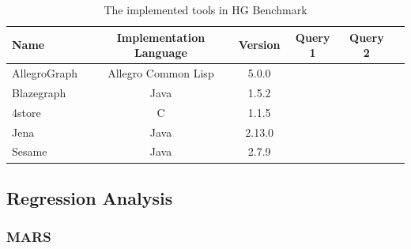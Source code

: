 \begin{table}[ht]
	\footnotesize
	\centering
	
	\begin{tabular}{ l c c c c c}
		\toprule
		Name & Implementation Language& Version & Query 1 & Query 2\\ 
		\midrule 
		AllegroGraph~\cite{allegro} & Allegro Common Lisp & 5.0.0  & \textbullet&  \textbullet \\ \hline
		Blazegraph~\cite{blaze} & Java  & 1.5.2 & \textbullet & \textbullet\\ \hline
		4store~\cite{4store} & C  & 1.1.5 & & \textbullet \\ \hline
		Jena~\cite{jena_api} & Java & 2.13.0 & \textbullet & \textbullet\\ \hline
		Sesame~\cite{sesame} & Java & 2.7.9 & \textbullet & \textbullet\\ \hline
		\bottomrule
	\end{tabular}
	\caption{The implemented tools in HG Benchmark}
	\label{tab:tools}
\end{table}


\subsection{Regression Analysis}

\subsubsection{MARS}


